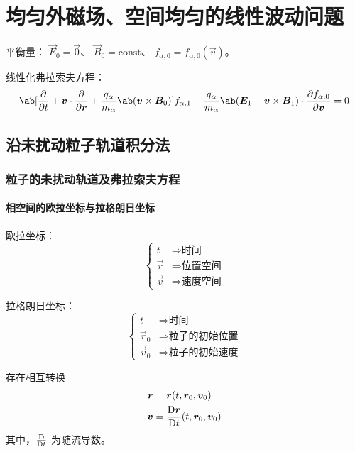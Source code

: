 
\chapter{均匀外磁场、空间均匀的线性波动问题}

平衡量：
$\vec{E}_0 = \vec{0}$、
$\vec{B}_0 = \text{const}$、
$f_{\alpha,0} = f_{\alpha,0}(\vec{v})$。

线性化弗拉索夫方程：
\begin{equation}
\ab[
    \pdv{}{t}
    + \vec{v} \cdot \pdv{}{\vec{r}}
    + \frac{q_\alpha}{m_\alpha} \ab(\vec{v} \times \vec{B}_0)
] f_{\alpha,1}
+ \frac{q_\alpha}{m_\alpha}
\ab(\vec{E}_1 + \vec{v} \times \vec{B}_1)
\cdot \pdv{f_{\alpha, 0}}{\vec{v}}
= 0
\end{equation}

\section{沿未扰动粒子轨道积分法}

\subsection{粒子的未扰动轨道及弗拉索夫方程}

\subsubsection{相空间的欧拉坐标与拉格朗日坐标}

欧拉坐标：
\begin{equation}\begin{cases}
t & \Rightarrow \text{时间} \\
\vec{r} & \Rightarrow \text{位置空间} \\
\vec{v} & \Rightarrow \text{速度空间}
\end{cases}\end{equation}

拉格朗日坐标：
\begin{equation}\begin{cases}
t & \Rightarrow \text{时间} \\
\vec{r}_0 & \Rightarrow \text{粒子的初始位置} \\
\vec{v}_0 & \Rightarrow \text{粒子的初始速度}
\end{cases}\end{equation}

存在相互转换
\begin{equation}\begin{aligned}
\vec{r} &= \vec{r}(t, \vec{r}_0, \vec{v}_0) \\
\vec{v} &= \mdv{\vec{r}}{t}(t, \vec{r}_0, \vec{v}_0)
\end{aligned}\end{equation}
其中，$\mdv{}{t}$ 为随流导数。

